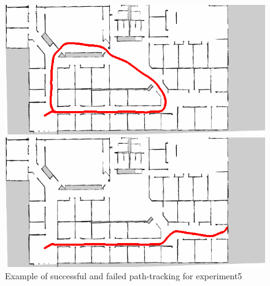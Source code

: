 \begin{figure}[h]
  \begin{minipage}[b]{0.45\linewidth}
    \centering
    \includegraphics[keepaspectratio, scale=0.33]{images/mazemaze/traject1.png}
    \subcaption{}
  \end{minipage}
  \begin{minipage}[b]{0.45\linewidth}
    \centering
    \includegraphics[keepaspectratio, scale=0.33]{images/mazemaze/traject8.png}
    \subcaption{}
  \end{minipage}
\caption{Example of successful and failed path-tracking for experiment5}
\label{Fig:fail5}
\end{figure}

